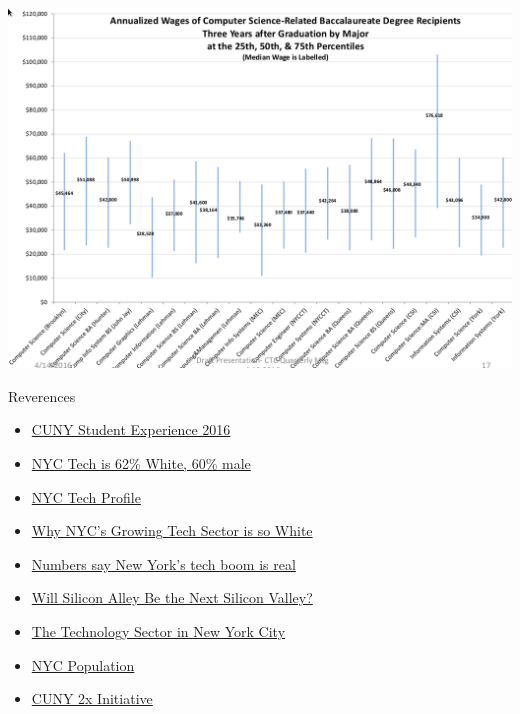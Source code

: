 \documentclass[presetation]{beamer}
\begin{document}
\begin{frame}[label={sec:org7d51512}]{}
\begin{center}
\includegraphics[width=.9\linewidth]{./images/salaryDist.png}
\end{center}
\end{frame}















\begin{frame}[label={sec:org44261b2}]{Reverences}
\begin{itemize}
\item \href{http://www2.cuny.edu/wp-content/uploads/sites/4/page-assets/about/administration/offices/oira/institutional/surveys/SES\_Presentation\_EMC\_accessible.pdf}{CUNY Student Experience 2016}
\item \href{https://techcrunch.com/2015/08/20/new-york-citys-tech-industry-is-62-percent-white-60-percent-male/}{NYC Tech is 62\% White, 60\% male}
\item \href{https://nycfuture.org/data/nycs-tech-profile}{NYC Tech Profile}
\item \href{https://citylimits.org/2015/09/15/why-is-new-york-citys-growing-technology-sector-so-white/}{Why NYC's Growing Tech Sector is so White}
\item \href{http://www.crainsnewyork.com/article/20150706/BLOGS01/150709955/numbers-say-new-yorks-tech-boom-is-real}{Numbers say New York's tech boom is real}
\item \href{http://libertystreeteconomics.newyorkfed.org/2015/07/will-silicon-alley-be-the-next-silicon-valley.html\#.VZvrd-fDFB8}{Will Silicon Alley Be the Next Silicon Valley?}
\item \href{https://www.osc.state.ny.us/osdc/rpt4-2018.pdf}{The Technology Sector in New York City}
\item \href{http://worldpopulationreview.com/us-cities/new-york-city-population/}{NYC Population}
\item \href{http://www1.nyc.gov/office-of-the-mayor/news/677-17/de-blasio-administration-new-initiative-double-number-graduates-tech}{CUNY 2x Initiative}
\end{itemize}
\end{frame}
\end{document}
